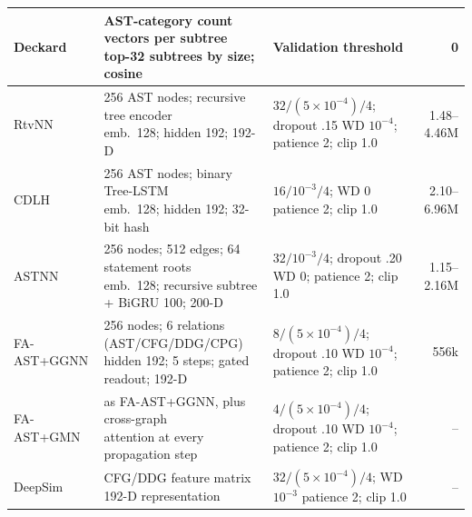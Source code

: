 \begin{table}[!htbp]
\begin{tabularx}{\columnwidth}{@{}
m{}
m{}
X
r@{}}
Deckard
&
\shortstack[l]{AST-category count vectors per subtree\\
top-32 subtrees by size; cosine}
&
Validation threshold
&
0
\\
\midrule

RtvNN
&
\shortstack[l]{256 AST nodes; recursive tree encoder\\
emb.\ 128; hidden 192; 192-D}
&
\shortstack[l]{$32/(5{\times}10^{-4})/4$; dropout .15\\
WD $10^{-4}$; patience 2; clip 1.0}
&
1.48--4.46M
\\
\midrule

CDLH
&
\shortstack[l]{256 AST nodes; binary Tree-LSTM\\
emb.\ 128; hidden 192; 32-bit hash}
&
\shortstack[l]{$16/10^{-3}/4$; WD 0\\
patience 2; clip 1.0}
&
2.10--6.96M
\\
\midrule

ASTNN
&
\shortstack[l]{256 nodes; 512 edges; 64 statement roots\\
emb.\ 128; recursive subtree\\ + BiGRU 100; 200-D}
&
\shortstack[l]{$32/10^{-3}/4$; dropout .20\\
WD 0; patience 2; clip 1.0}
&
1.15--2.16M
\\
\midrule

FA-AST+GGNN
&
\shortstack[l]{256 nodes; 6 relations\\ (AST/CFG/DDG/CPG)\\
hidden 192; 5 steps; gated readout; 192-D}
&
\shortstack[l]{$8/(5{\times}10^{-4})/4$; dropout .10\\
WD $10^{-4}$; patience 2; clip 1.0}
&
556k
\\
\midrule

FA-AST+GMN
&
\shortstack[l]{as FA-AST+GGNN, plus cross-graph\\
attention at every propagation step}
&
\shortstack[l]{$4/(5{\times}10^{-4})/4$; dropout .10\\
WD $10^{-4}$; patience 2; clip 1.0}
&
--
\\
\midrule

DeepSim
&
\shortstack[l]{CFG/DDG feature matrix\\
192-D representation}
&
\shortstack[l]{$32/(5{\times}10^{-4})/4$; WD $10^{-3}$\\
patience 2; clip 1.0}
&
--
\\

\bottomrule
\end{tabularx}
\end{table}
